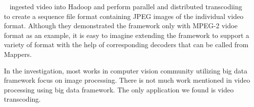 \citeauthor{2013_Pivotal}~\cite{2013_Pivotal} ingested video into Hadoop and
perform parallel and distributed transcodiing to create a sequence file format
containing JPEG images of the individual video format. Although they
demonstrated the framework only with MPEG-2 vidoe format as an example, it is
easy to imagine extending the framework to support a variety of format with the
help of corresponding decoders that can be called from Mappers. 

In the investigation, most works in computer vision community utilizing big data
framework focus on image processing. There is not much work mentioned in video
processing using big data framework. The only application we found is video
transcoding. 

 